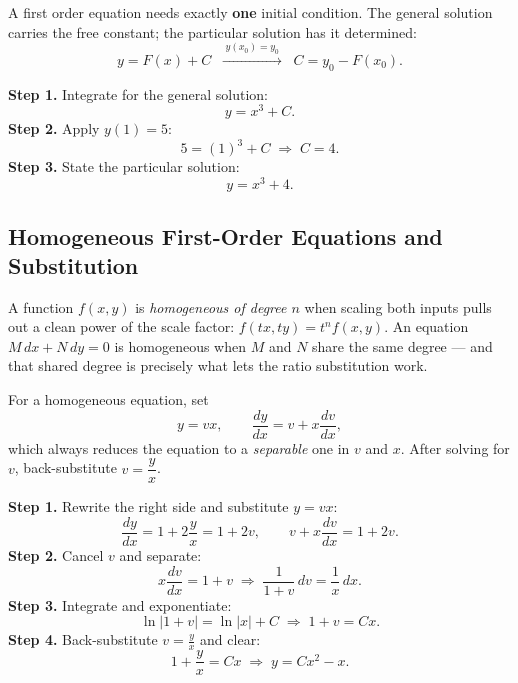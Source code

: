 \documentclass[11pt]{article}
\begin{document}
\begin{formulabox}
A first order equation needs exactly \textbf{one} initial condition. The
general solution carries the free constant; the particular solution has it
determined:
\[
    y = F(x) + C \;\;\xrightarrow{\;y(x_0)=y_0\;}\;\; C = y_0 - F(x_0).
\]
\end{formulabox}

\begin{examplebox}[Worked Example 2.3: Solve $\frac{dy}{dx} = 3x^{2}$, $\;y(1)=5$]
\textbf{Step 1.} Integrate for the general solution:
\[ y = x^{3} + C. \]
\textbf{Step 2.} Apply $y(1) = 5$:
\[ 5 = (1)^{3} + C \;\Longrightarrow\; C = 4. \]
\textbf{Step 3.} State the particular solution:
\[ y = x^{3} + 4. \]
\end{examplebox}

\subsection{Homogeneous First-Order Equations and Substitution}

A function $f(x,y)$ is \emph{homogeneous of degree $n$} when scaling both
inputs pulls out a clean power of the scale factor: $f(tx, ty) = t^{n}f(x,y)$.
An equation $M\,dx + N\,dy = 0$ is homogeneous when $M$ and $N$ share the same
degree --- and that shared degree is precisely what lets the ratio
substitution work.

\begin{formulabox}[The Substitution $y = vx$]
For a homogeneous equation, set
\[
    y = vx, \qquad \frac{dy}{dx} = v + x\frac{dv}{dx},
\]
which always reduces the equation to a \emph{separable} one in $v$ and $x$.
After solving for $v$, back-substitute $v = \dfrac{y}{x}$.
\end{formulabox}

\begin{examplebox}[Worked Example 2.4: Solve $\frac{dy}{dx} = \frac{x + 2y}{x}$]
\textbf{Step 1.} Rewrite the right side and substitute $y = vx$:
\[ \frac{dy}{dx} = 1 + 2\frac{y}{x} = 1 + 2v, \qquad v + x\frac{dv}{dx} = 1 + 2v. \]
\textbf{Step 2.} Cancel $v$ and separate:
\[ x\frac{dv}{dx} = 1 + v \;\Longrightarrow\; \frac{1}{1+v}\,dv = \frac{1}{x}\,dx. \]
\textbf{Step 3.} Integrate and exponentiate:
\[ \ln|1+v| = \ln|x| + C \;\Longrightarrow\; 1 + v = Cx. \]
\textbf{Step 4.} Back-substitute $v = \frac{y}{x}$ and clear:
\[ 1 + \frac{y}{x} = Cx \;\Longrightarrow\; y = Cx^{2} - x. \]
\end{examplebox}
\end{document}

